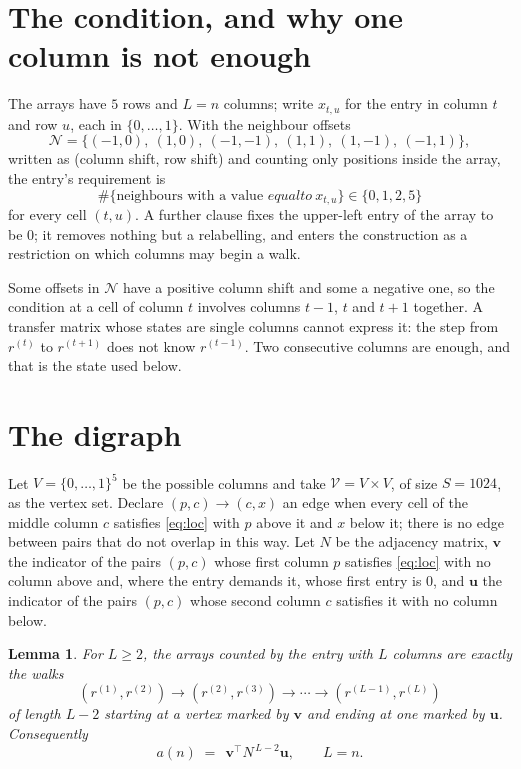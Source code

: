 \documentclass[11pt,a4paper]{article}
\theoremstyle{plain}
\newtheorem{lemma}[theorem]{Lemma}
\theoremstyle{definition}
\begin{document}
\section{The condition, and why one column is not enough}

The arrays have $5$ rows and $L=n$ columns; write $x_{t,u}$ for the entry in
column $t$ and row $u$, each in $\{0,\dots,1\}$. With the neighbour offsets
\[
\mathcal N=\{(-1,0),\ (1,0),\ (-1,-1),\ (1,1),\ (1,-1),\ (-1,1)\},
\]
written as (column shift, row shift) and counting only positions inside the array, the
entry's requirement is
\begin{equation}\label{eq:loc}
\#\{\text{neighbours with a value }equal to\ x_{t,u}\}\in\{0,1,2,5\}
\end{equation}
for every cell $(t,u)$. A further clause fixes the upper-left entry of the array to be $0$; it removes nothing but a relabelling, and enters the construction as a restriction on which columns may begin a walk.

Some offsets in $\mathcal N$ have a positive column shift and some a negative one, so the
condition at a cell of column $t$ involves columns $t-1$, $t$ and $t+1$ together. A transfer
matrix whose states are single columns cannot express it: the step from $r^{(t)}$ to
$r^{(t+1)}$ does not know $r^{(t-1)}$. Two consecutive columns are enough, and that is
the state used below.

\section{The digraph}

Let $V=\{0,\dots,1\}^{5}$ be the possible columns and take
$\mathcal V=V\times V$, of size $S=1024$, as the vertex set. Declare $(p,c)\to(c,x)$ an edge
when every cell of the middle column $c$ satisfies \eqref{eq:loc} with $p$ above it and $x$
below it; there is no edge between pairs that do not overlap in this way. Let $N$ be the
adjacency matrix, $\mathbf{v}$ the indicator of the pairs $(p,c)$ whose first column $p$
satisfies \eqref{eq:loc} with no column above and, where the entry demands it, whose first entry is $0$, and $\mathbf{u}$ the indicator of
the pairs $(p,c)$ whose second column $c$ satisfies it with no column below.

\begin{lemma}\label{lem:walk}
For $L\ge2$, the arrays counted by the entry with $L$ columns are exactly the walks
\[
(r^{(1)},r^{(2)})\to(r^{(2)},r^{(3)})\to\cdots\to(r^{(L-1)},r^{(L)})
\]
of length $L-2$ starting at a vertex marked by $\mathbf{v}$ and ending at one marked by
$\mathbf{u}$. Consequently
\[
a(n)\;=\;\,\mathbf{v}^{\!\top}N^{\,L-2}\mathbf{u},\qquad L=n .
\]
\end{lemma}
\end{document}

